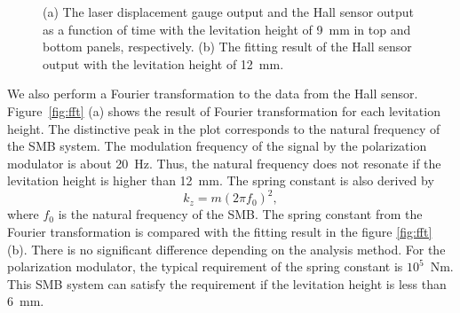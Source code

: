 \documentclass[a4paper,11pt]{jpconf}
\begin{document}
\begin{figure}[htbp]
  \centering
  \begin{minipage}{0.45\hsize}
  \end{minipage}
  \begin{minipage}{0.45\hsize}
    \centering
  \end{minipage}
  \caption{(a) The laser displacement gauge output and the Hall sensor output as a function of time with the levitation height of 9~mm in top and bottom panels, respectively.
    (b) The fitting result of the Hall sensor output with the levitation height of 12~mm.}
  \label{fig:vibration}
\end{figure}

We also perform a Fourier transformation to the data from the Hall sensor.
Figure~\ref{fig:fft} (a) shows the result of Fourier transformation for each levitation height.
The distinctive peak in the plot corresponds to the natural frequency of the SMB system.
The modulation frequency of the signal by the polarization modulator is about 20~Hz.
Thus, the natural frequency does not resonate if the levitation height is higher than 12~mm.
The spring constant is also derived by
\begin{equation}
  k_{z} = m (2 \pi f_{0})^{2},
\end{equation}
where $f_{0}$ is the natural frequency of the SMB.
The spring constant from the Fourier transformation is compared with the fitting result in the figure \ref{fig:fft} (b).
There is no significant difference depending on the analysis method.
For the polarization modulator, the typical requirement of the spring constant is $10^{5}$~Nm.
This SMB system can satisfy the requirement if the levitation height is less than 6~mm.
\end{document}
